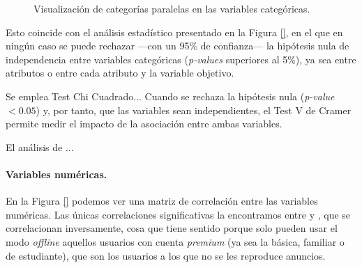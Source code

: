 \begin{figure}[h!]
    \caption{Visualización de categorías paralelas en las variables categóricas.}
    \label{fig:churn_spotify_ParallelCategories_NominalAttributes}
\end{figure} 

Esto coincide con el análisis estadístico presentado en la Figura \ref{}, en el que en ningún caso se puede rechazar ---con un 95\% de confianza--- la hipótesis nula de independencia entre variables categóricas (\textit{p-values} superiores al 5\%), ya sea entre atributos o entre cada atributo y la variable objetivo.

\begin{tcolorbox}
    [colback=gray!5!white, colframe=gray!60!black, title=Correlación entre dos variables categóricas]

    Se emplea Test Chi Cuadrado...  
    Cuando se rechaza la hipótesis nula (\textit{p-value}$<0.05$) y, por tanto, que las variables sean independientes, el Test V de Cramer permite medir el impacto de la asociación entre ambas variables.

\end{tcolorbox}

El análisis de ... 


\paragraph*{Variables numéricas.}



En la Figura \ref{} podemos ver una matriz de correlación entre las variables numéricas. Las únicas correlaciones significativas la encontramos entre  y , que se correlacionan inversamente, cosa que tiene sentido porque solo pueden usar el modo \textit{offline} aquellos usuarios con cuenta \textit{premium} (ya sea la básica, familiar o de estudiante), que son los usuarios a los que no se les reproduce anuncios.

